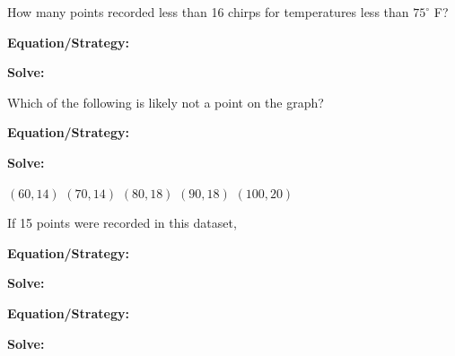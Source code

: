 \begin{multicols*}{2}
\begin{outline}[enumerate]
\medium

\1 How many points recorded less than 16 chirps for temperatures less than $75^\circ$ F?

\bigskip
\textbf{Equation/Strategy:} \hrulefill

\bigskip
\textbf{Solve:}

\vfill
{}

\midline

\1 Which of the following is likely not a point on the graph?

\bigskip
\textbf{Equation/Strategy:} \hrulefill

\bigskip
\textbf{Solve:}

\vfill
\2 $(60,14)$
\2 $(70,14)$
\2 $(80,18)$
\2 $(90,18)$
\2 $(100,20)$

\columnbreak
\advanced

\1 If 15 points were recorded in this dataset, 

\bigskip
\textbf{Equation/Strategy:} \hrulefill

\bigskip
\textbf{Solve:}

\vfill
\2 
\2 
\2 
\2 
\2 

\midline

\1 

\bigskip
\textbf{Equation/Strategy:}

\bigskip
\textbf{Solve:}

\vfill
\2
\2
\2
\2
\2
\end{outline}
\end{multicols*}